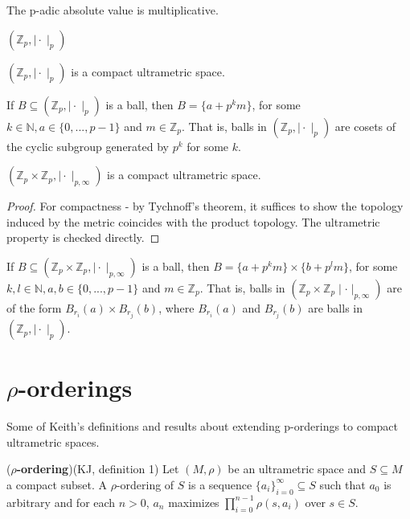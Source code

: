 \begin{proposition}
	The p-adic absolute value is multiplicative.
\end{proposition}

\begin{construction}
	$(\mathbb{Z}_p, \mid\cdot\mid_p)$	
\end{construction}	

\begin{corollary}
	$(\mathbb{Z}_p, \mid\cdot\mid_p)$ is a compact ultrametric space.
\end{corollary}

\begin{proposition}
	If $B \subseteq (\mathbb{Z}_p, \mid\cdot\mid_p)$ is a ball, then $B = \{a + p^km\}$, for some $k \in \mathbb{N}, a \in \{0,...,p-1\}$ and $m \in \mathbb{Z}_p$. That is, balls in $(\mathbb{Z}_p, \mid\cdot\mid_p)$ are cosets of the cyclic subgroup generated by $p^k$ for some $k$. 
\end{proposition}

\begin{proposition}
	$(\mathbb{Z}_p \times \mathbb{Z}_p, \mid \cdot \mid_{p,\infty})$ is a compact ultrametric space. 
	\end{proposition}
	
\begin{proof}
	For compactness - by Tychnoff's theorem, it suffices to show the topology induced by the metric coincides with the product topology. The ultrametric property is checked directly.
\end{proof}

\begin{proposition}
	If $B \subseteq (\mathbb{Z}_p \times \mathbb{Z}_p, \mid\cdot\mid_{p,\infty})$ is a ball, then $B = \{a + p^km\} \times \{b + p^lm\}$, for some $k,l \in \mathbb{N}, a,b \in \{0,...,p-1\}$ and $m \in \mathbb{Z}_p$. That is, balls in $(\mathbb{Z}_p \times \mathbb{Z}_p  \mid\cdot\mid_{p, \infty})$ are of the form $B_{r_i}(a) \times B_{r_j}(b)$, where $B_{r_i}(a)$ and $B_{r_j}(b)$ are balls in $(\mathbb{Z}_p, \mid\cdot\mid_p)$. 
\end{proposition}

\section{$\rho$-orderings}
\noindent Some of Keith's definitions and results about extending p-orderings to compact ultrametric spaces. 

\begin{definition}
	(\textbf{$\rho$-ordering})(KJ, definition 1) Let $(M, \rho)$ be an ultrametric space and $S \subseteq M$ a compact subset. A $\rho$-ordering of $S$ is a sequence $\{a_i\}_{i=0}^\infty \subseteq S$ such that $a_0$ is arbitrary and for each $n > 0$, $a_n$ maximizes $\prod_{i=0}^{n-1} \rho(s,a_i)$ over $s \in S$.  
\end{definition}

